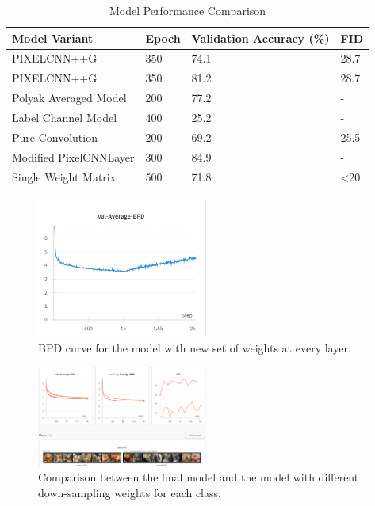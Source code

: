 \documentclass{article}
\begin{document}
\begin{table}
    \caption{Model Performance Comparison}
    \label{model_cmp}
    \centering
    \begin{tabular}{llll}
      \toprule
      Model Variant & Epoch & Validation Accuracy (\%) & FID \\
      \midrule
      PIXELCNN++G   & 350 & 74.1 & 28.7 \\
      PIXELCNN++G   & 350 & 81.2 & 28.7 \\
      Polyak Averaged Model     & 200 & 77.2 & - \\
      Label Channel Model       & 400 & 25.2 & - \\
      Pure Convolution          & 200 & 69.2 & 25.5 \\
      Modified PixelCNNLayer    & 300 & 84.9 & - \\
      Single Weight Matrix      & 500 & 71.8 & <20 \\
      \bottomrule
    \end{tabular}
\end{table}

\begin{figure}
    \centering
    \includegraphics[width=0.5\textwidth]{report_data/f_2_BPD.png}
    \caption{BPD curve for the model with new set of weights at every layer.}
    \label{fig:F-BPD}
  \end{figure}

  \begin{figure}
    \centering
    \includegraphics[width=0.5\textwidth]{report_data/f_pp_cmp.png}
    \caption{Comparison between the final model and the model with different down-sampling weights for each class.}
    \label{fig:F-pp_cmp}
  \end{figure}
\end{document}
